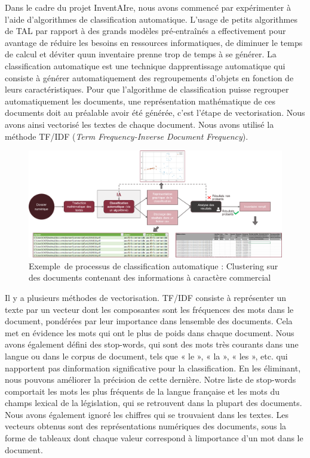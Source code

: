Dans le cadre du projet InventAIre, nous avons commencé par expérimenter
à l'aide d'algorithmes de classification automatique. L'usage de petits
algorithmes de TAL par rapport à des grands modèles pré-entraînés a
effectivement pour avantage de réduire les besoins en ressources
informatiques, de diminuer le temps de calcul et
d\textquotesingle éviter qu\textquotesingle un inventaire prenne trop de
temps à se générer. La classification automatique est une technique
d\textquotesingle apprentissage automatique qui consiste à générer
automatiquement des regroupements d'objets en fonction de leurs
caractéristiques. Pour que l'algorithme de classification puisse
regrouper automatiquement les documents, une représentation mathématique
de ces documents doit au préalable avoir été générée, c'est l'étape de
\gls{vectorisation}. Nous avons ainsi vectorisé les textes de chaque document.
Nous avons utilisé la méthode TF/IDF (\emph{Term Frequency-Inverse
	Document Frequency}). 

\begin{figure}[!h]
	\centerline{\includegraphics[width=\textwidth]{./media/clustering.png}}
	\caption{Exemple de processus de classification automatique : Clustering sur des documents contenant des informations à caractère commercial}
\end{figure}

Il y a plusieurs méthodes de vectorisation. TF/IDF
consiste à représenter un texte par un vecteur dont les composantes sont
les fréquences des mots dans le document, pondérées par leur importance
dans l\textquotesingle ensemble des documents. Cela met en
évidence les mots qui ont le plus de poids dans chaque document. Nous
avons également défini des \gls{stop-words}, qui sont des mots très
courants dans une langue ou dans le corpus de document, tels que « le »,
« la », « les », etc. qui n\textquotesingle apportent pas
d\textquotesingle information significative pour la classification. En
les éliminant, nous pouvons améliorer la précision de cette dernière.
Notre liste de \gls{stop-words} comportait les mots les plus fréquents
de la langue française et les mots du champs lexical de la législation,
qui se retrouvent dans la plupart des documents. Nous avons également
ignoré les chiffres qui se trouvaient dans les textes. Les vecteurs
obtenus sont des représentations numériques des documents, sous la forme
de tableaux dont chaque valeur correspond à
l\textquotesingle importance d'un mot dans le document.

